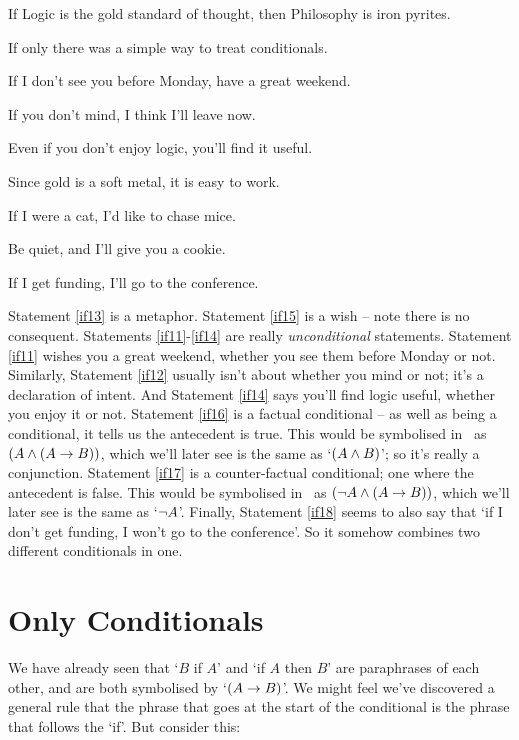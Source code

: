 \documentclass[PHIL101-Textbook.tex]{subfiles}
\begin{document}
\begin{earg}
\item[\ex{if13}] If Logic is the gold standard of thought, then Philosophy is iron pyrites.
\item[\ex{if15}] If only there was a simple way to treat conditionals.
\item[\ex{if11}] If I don't see you before Monday, have a great weekend.
\item[\ex{if12}] If you don't mind, I think I'll leave now.
\item[\ex{if14}] Even if you don't enjoy logic, you'll find it useful.
\item[\ex{if16}] Since gold is a soft metal, it is easy to work.
\item[\ex{if17}] If I were a cat, I'd like to chase mice.
\item [\ex{ifcmd1}] Be quiet, and I'll give you a cookie.
\item[\ex{if18}] If I get funding, I'll go to the conference.
\end{earg}
Statement \ref{if13} is a metaphor. Statement \ref{if15} is a wish -- note there is no consequent. Statements \ref{if11}-\ref{if14} are really \emph{unconditional} statements. Statement \ref{if11} wishes you a great weekend, whether you see them before Monday or not. Similarly, Statement \ref{if12} usually isn't about whether you mind or not; it's a declaration of intent. And Statement \ref{if14} says you'll find logic useful, whether you enjoy it or not. Statement \ref{if16} is a factual conditional -- as well as being a conditional, it tells us the antecedent is true. This would be symbolised in \tfl\ as $(A \land (A \rightarrow B))$, which we'll later see is the same as `$(A \land B)$'; so it's really a conjunction. Statement \ref{if17} is a counter-factual conditional; one where the antecedent is false. This would be symbolised in \tfl\ as $(\neg A \land (A \rightarrow B))$, which we'll later see is the same as `$\neg A$'.
Finally, Statement \ref{if18} seems to also say that `if I don't get funding, I won't go to the conference'. So it somehow combines two different conditionals in one.


\section{Only Conditionals}\label{s.only}

We have already seen that `$B$ if $A$' and `if $A$ then $B$' are paraphrases of each other, and are both symbolised by `$(A \rightarrow B)$'. We might feel we've discovered a general rule that the phrase that goes at the start of the conditional is the phrase that follows the `if'. But consider this:
\end{document}
